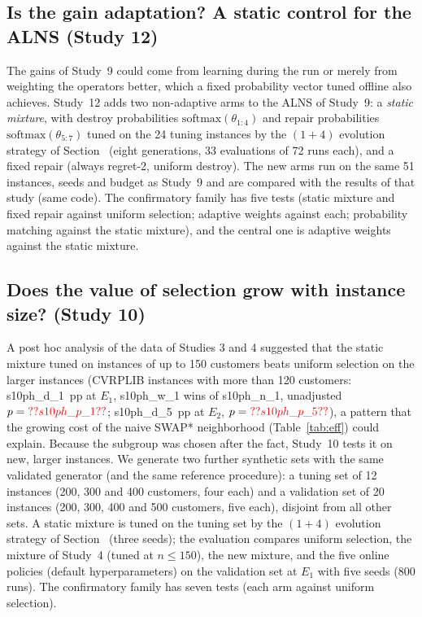\subsection{Is the gain adaptation? A static control for the ALNS (Study 12)}\label{sec:s12}
The gains of Study~9 could come from learning during the run or merely from weighting the operators better, which a fixed probability vector tuned offline also achieves. Study~12 adds two non-adaptive arms to the ALNS of Study~9: a \emph{static mixture}, with destroy probabilities $\mathrm{softmax}(\theta_{1:4})$ and repair probabilities $\mathrm{softmax}(\theta_{5:7})$ tuned on the 24 tuning instances by the $(1{+}4)$ evolution strategy of Section~ (eight generations, 33 evaluations of 72 runs each), and a fixed repair (always regret-2, uniform destroy). The new arms run on the same 51 instances, seeds and budget as Study~9 and are compared with the results of that study (same code). The confirmatory family has five tests (static mixture and fixed repair against uniform selection; adaptive weights against each; probability matching against the static mixture), and the central one is adaptive weights against the static mixture.

\subsection{Does the value of selection grow with instance size? (Study 10)}\label{sec:s10design}
A post hoc analysis of the data of Studies 3 and 4 suggested that the static mixture tuned on instances of up to 150 customers beats uniform selection on the larger instances (CVRPLIB instances with more than 120 customers: \num{s10ph_d_1}~pp at $E_1$, \num{s10ph_w_1} wins of \num{s10ph_n_1}, unadjusted $p=\num{s10ph_p_1}$; \num{s10ph_d_5}~pp at $E_2$, $p=\num{s10ph_p_5}$), a pattern that the growing cost of the naive SWAP* neighborhood (Table~\ref{tab:eff}) could explain. Because the subgroup was chosen after the fact, Study~10 tests it on new, larger instances. We generate two further synthetic sets with the same validated generator (and the same reference procedure): a tuning set of 12 instances (200, 300 and 400 customers, four each) and a validation set of 20 instances (200, 300, 400 and 500 customers, five each), disjoint from all other sets. A static mixture is tuned on the tuning set by the $(1{+}4)$ evolution strategy of Section~ (three seeds); the evaluation compares uniform selection, the mixture of Study~4 (tuned at $n\le150$), the new mixture, and the five online policies (default hyperparameters) on the validation set at $E_1$ with five seeds (800 runs). The confirmatory family has seven tests (each arm against uniform selection).

